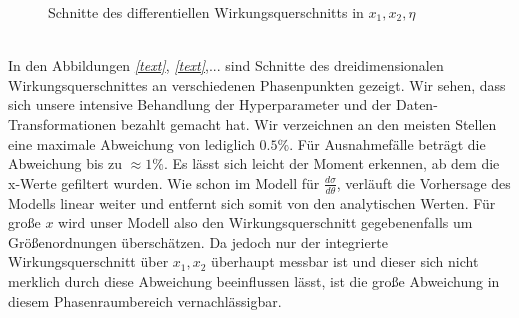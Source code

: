 \begin{figure}[tbp]
	\caption{Schnitte des differentiellen Wirkungsquerschnitts in $x_1, x_2, \eta$}
\end{figure}
\\
In den Abbildungen \textit{\autoref{text}}, \textit{\autoref{text}},... sind Schnitte des dreidimensionalen Wirkungsquerschnittes an verschiedenen Phasenpunkten gezeigt. Wir sehen, dass sich unsere intensive Behandlung der Hyperparameter und der Daten-Transformationen bezahlt gemacht hat. Wir verzeichnen an den meisten Stellen eine maximale Abweichung von lediglich $0.5\%$. Für Ausnahmefälle beträgt die Abweichung bis zu $\approx 1\%$. Es lässt sich leicht der Moment erkennen, ab dem die x-Werte gefiltert wurden. Wie schon im Modell für $\frac{d\sigma}{d\theta}$, verläuft die Vorhersage des Modells linear weiter und entfernt sich somit von den analytischen Werten. Für große $x$ wird unser Modell also den Wirkungsquerschnitt gegebenenfalls um Größenordnungen überschätzen. Da jedoch nur der integrierte Wirkungsquerschnitt über $x_1, x_2$ überhaupt messbar ist und dieser sich nicht merklich durch diese Abweichung beeinflussen lässt, ist die große Abweichung in diesem Phasenraumbereich vernachlässigbar. 
